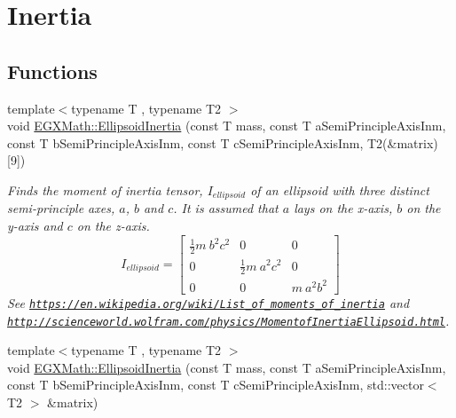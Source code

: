 \hypertarget{group___e_g_x_math-_geometry-3_d-_ellipsoid-_inertia}{}\section{Inertia}
\label{group___e_g_x_math-_geometry-3_d-_ellipsoid-_inertia}
\subsection*{Functions}
\begin{DoxyCompactItemize}
\item 
{\footnotesize template$<$typename T , typename T2 $>$ }\\void \mbox{\hyperlink{group___e_g_x_math-_geometry-3_d-_ellipsoid-_inertia_ga3b6f641f06037be75b8f51822eaa71bf}{E\+G\+X\+Math\+::\+Ellipsoid\+Inertia}} (const T mass, const T a\+Semi\+Principle\+Axis\+Inm, const T b\+Semi\+Principle\+Axis\+Inm, const T c\+Semi\+Principle\+Axis\+Inm, T2(\&matrix)\mbox{[}9\mbox{]})
\begin{DoxyCompactList}\small\item\em Finds the moment of inertia tensor, $I_{ellipsoid}$ of an ellipsoid with three distinct semi-\/principle axes, $a$, $b$ and $c$. It is assumed that $a$ lays on the x-\/axis, $b$ on the y-\/axis and $c$ on the z-\/axis. \[ I_{ellipsoid}=\begin{bmatrix} \frac{1}{2}m\ b^2c^2 & 0 & 0\\ 0 & \frac{1}{2}m\ a^2c^2 & 0\\ 0 & 0 & m\ a^2b^2 \end{bmatrix} \] See \href{https://en.wikipedia.org/wiki/List_of_moments_of_inertia}{\tt https\+://en.\+wikipedia.\+org/wiki/\+List\+\_\+of\+\_\+moments\+\_\+of\+\_\+inertia} and \href{http://scienceworld.wolfram.com/physics/MomentofInertiaEllipsoid.html}{\tt http\+://scienceworld.\+wolfram.\+com/physics/\+Momentof\+Inertia\+Ellipsoid.\+html}. \end{DoxyCompactList}\item 
{\footnotesize template$<$typename T , typename T2 $>$ }\\void \mbox{\hyperlink{group___e_g_x_math-_geometry-3_d-_ellipsoid-_inertia_ga05dee023c58e7615d16e431bf5a99609}{E\+G\+X\+Math\+::\+Ellipsoid\+Inertia}} (const T mass, const T a\+Semi\+Principle\+Axis\+Inm, const T b\+Semi\+Principle\+Axis\+Inm, const T c\+Semi\+Principle\+Axis\+Inm, std\+::vector$<$ T2 $>$ \&matrix)

\end{DoxyCompactItemize}
